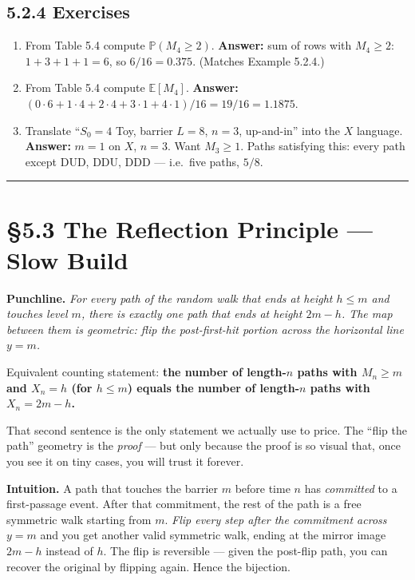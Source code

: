\documentclass[
  10pt,
  twoside]{book}
\providecommand{\tightlist}{%
  \setlength{\itemsep}{0pt}\setlength{\parskip}{0pt}}
\begin{document}
\subsection{5.2.4 Exercises}\label{exercises-22}

\begin{enumerate}
\def\labelenumi{\arabic{enumi}.}
\tightlist
\item
  From Table 5.4 compute \(\mathbb P(M_4 \ge 2)\). \textbf{Answer:} sum
  of rows with \(M_4 \ge 2\): \(1 + 3 + 1 + 1 = 6\), so
  \(6/16 = 0.375\). (Matches Example 5.2.4.)
\item
  From Table 5.4 compute \(\mathbb E[M_4]\). \textbf{Answer:}
  \((0 \cdot 6 + 1 \cdot 4 + 2 \cdot 4 + 3 \cdot 1 + 4 \cdot 1)/16 = 19/16 = 1.1875\).
\item
  Translate ``\(S_0 = 4\) Toy, barrier \(L = 8\), \(n = 3\), up-and-in''
  into the \(X\) language. \textbf{Answer:} \(m = 1\) on \(X\),
  \(n = 3\). Want \(M_3 \ge 1\). Paths satisfying this: every path
  except DUD, DDU, DDD --- i.e.~five paths, \(5/8\).
\end{enumerate}

\begin{center}\rule{0.5\linewidth}{0.5pt}\end{center}

\section{§5.3 The Reflection Principle --- Slow
Build}\label{the-reflection-principle-slow-build}

\textbf{Punchline.} \emph{For every path of the random walk that ends at
height \(h \le m\) and touches level \(m\), there is exactly one path
that ends at height \(2m - h\). The map between them is geometric: flip
the post-first-hit portion across the horizontal line \(y = m\).}

Equivalent counting statement: \textbf{the number of length-\(n\) paths
with \(M_n \ge m\) and \(X_n = h\) (for \(h \le m\)) equals the number
of length-\(n\) paths with \(X_n = 2m - h\).}

That second sentence is the only statement we actually use to price. The
``flip the path'' geometry is the \emph{proof} --- but only because the
proof is so visual that, once you see it on tiny cases, you will trust
it forever.

\textbf{Intuition.} A path that touches the barrier \(m\) before time
\(n\) has \emph{committed} to a first-passage event. After that
commitment, the rest of the path is a free symmetric walk starting from
\(m\). \emph{Flip every step after the commitment across \(y = m\)} and
you get another valid symmetric walk, ending at the mirror image
\(2m - h\) instead of \(h\). The flip is reversible --- given the
post-flip path, you can recover the original by flipping again. Hence
the bijection.
\end{document}
